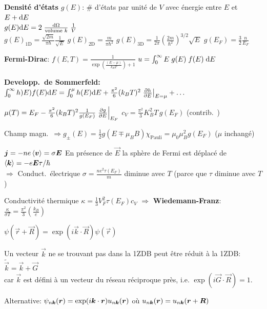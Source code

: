 \begin{squishlist}
    \item\textbf{Densité d'états} $g(E)$: \# d'états par unité de $V$ avec énergie entre $E$ et $E+\ud E$\\
    $g(E) \ud E = 2\; \frac{\ud \Omega}{\text{volume $k$}} \; \frac{1}{V}$ \\ 
    $g(E)_{\text{1D}} =\frac{\sqrt{2m}}{\pi \hbar}\frac{1}{\sqrt{E}}$ \quad
    $g(E)_{\text{2D}} = \frac{m}{\pi \hbar^2}$ \quad
    $g(E)_{\text{3D}} = \frac{1}{2\pi} \left(\frac{2m}{\hbar^2}\right)^{3/2}\sqrt{E}$ \quad $g(E_F) = \frac{3}{2} \frac{n}{E_F}$
    \item \textbf{Fermi-Dirac}: $f(E,T) = \frac{1}{\exp\left(\frac{(E- \mu)}{k_B T}\right) + 1}$ \squishsep $u = \int_{0}^{\infty}E \; g(E)\; f(E) \; \ud E$
    \item \textbf{Developp.\ de Sommerfeld:} $\int_{0}^{\infty}h)E) f(E) \ud E = \int_{0}^{\mu} h(E) \ud E + \frac{\pi^2}{6}(k_BT)^2 \left.\D{E}{h}\right|_{E=\mu} + \ldots$
    \item $\mu(T) = E_F - \frac{\pi^2}{6}(k_B T)^2 \frac{1}{g(E_F)} \left.\D{E}{g}\right|_{E_F}$ \squishsep $c_V = \frac{\pi^2}{3}K_B^2 T \, g(E_F) $ (contrib.\ \elec)
    \item Champ magn.\ $\Rightarrow g_{\pm}(E) = \frac{1}{2}g(E\mp \mu_B B)$\quad $\chi_{\text{Pauli}} = \mu_0 \mu_B^2 g(E_F)$ ($\mu$ inchangé)
    \item $\vec{j} = -ne \braket{\vec{v}} = \sigma \vec{E}$ \quad En présence de $\vec{E}$ la sphère de Fermi est déplacé de $\braket{\vk}=-e\vec{E}\tau / \hbar$ \\
    $\Longrightarrow$ Conduct.\ électrique $\sigma = \frac{n e^2 \tau(E_F)}{m}$ diminue avec $T$ (parce que $\tau$ diminue avec $T$)
    \item Conductivité thermique $\kappa = \frac{1}{3}V_F^2 \tau(E_F) c_V$ $\Rightarrow$ \textbf{Wiedemann-Franz}: $\frac{\kappa}{\sigma T} = \frac{\pi^2}{3}\left(\frac{k_B}{e}\right)$
\end{squishlist}


\begin{squishlist}
    \item $\psi(\vec{r} + \vec{R}) = \exp(i\vec{k} \cdot \vec{R}) \psi(\vec{r})$
    \item Un vecteur $\vec{k}$ ne se trouvant pas dans la 1ZDB peut être réduit à la 1ZDB: $\tilde{\vec{k}} = \vec{k} + \vec{G}$ \\
    car $\vec{k}$ est défini à un vecteur du réseau réciproque près, i.e. $\exp(i \vec{G}\cdot \vec{R}) = 1$.
    \item Alternative: $\psi_{n \vec{k}}(\vr) = \exp(i \vk \cdot \vr ) u_{n \vk}(\vr)$ où $u_{n \vk}(\vr) =  u_{n \vk}(\vr+ \vR)$
\end{squishlist}

